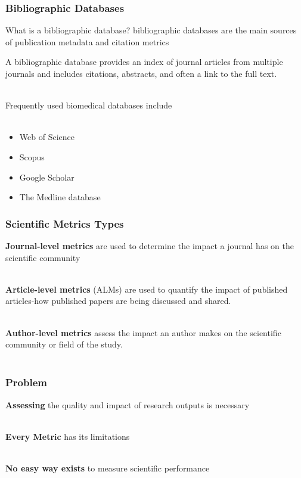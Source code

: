\documentclass{beamer}
\begin{document}
\begin{frame}

    \frametitle{Bibliographic Databases}

    \begin{block}{What is a bibliographic database?}
        bibliographic databases are the main sources of publication metadata and citation metrics
    \end{block}

    A bibliographic database provides an index of journal articles from multiple journals and includes citations, abstracts, and often a link to the full text.\\~\

    Frequently used biomedical databases include\\~\
    \begin{itemize}
   \item Web of Science
   \item Scopus 
   \item  Google Scholar 
   \item  The Medline database
   \end{itemize}

\end{frame}
\begin{frame}

    \frametitle{Scientific Metrics Types}
     \textbf{Journal-level metrics} are used to determine the impact a journal has on the scientific community\\~\

     \textbf{Article-level metrics} (ALMs) are used to quantify the impact of published articles-how published papers are being discussed and shared.\\~\

    \textbf{Author-level metrics} assess the impact an author makes on the scientific community or field of the study.\\~\

\end{frame}
\begin{frame}

    \frametitle{Problem}

    \textbf{Assessing} the quality and impact of research outputs is necessary \\~\



     \textbf{Every Metric} has its limitations\\~\



    \textbf{No easy way exists} to measure scientific performance\\~\


\end{frame}
\end{document}
